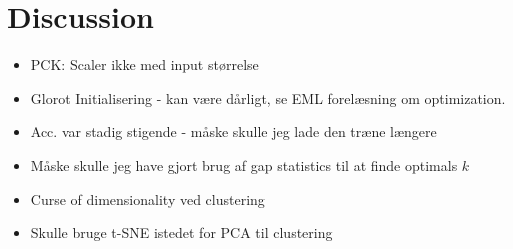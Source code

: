 \documentclass[./main.tex]{subfiles}
\begin{document}
\section{Discussion}
\begin{itemize}
    \item PCK: Scaler ikke med input størrelse
    \item Glorot Initialisering - kan være dårligt, se EML forelæsning om optimization.
    \item Acc. var stadig stigende - måske skulle jeg lade den træne længere
    \item Måske skulle jeg have gjort brug af gap statistics til at finde optimals $k$
    \item Curse of dimensionality ved clustering
    \item Skulle bruge t-SNE istedet for PCA til clustering
\end{itemize}
\end{document}
